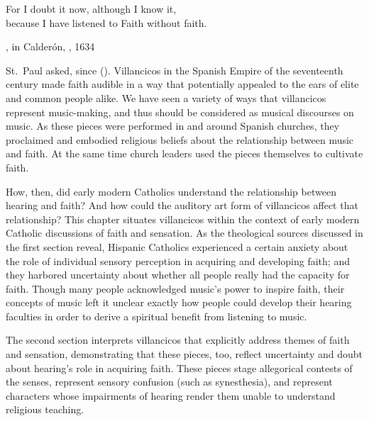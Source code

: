

\label{ch:faith-hearing}

\epigraph
{For I doubt it now, although I know it,\\
because I have listened to Faith without faith.}
{, in Calderón, , 1634}

 St.\ Paul asked, since  ().
Villancicos in the Spanish Empire of the seventeenth century made faith audible in a way that potentially appealed to the ears of elite and common people alike.
We have seen a variety of ways that villancicos represent music-making, and thus should be considered as musical discourses on music.
As these pieces were performed in and around Spanish churches, they proclaimed and embodied religious beliefs about the relationship between music and faith.
At the same time church leaders used the pieces themselves to cultivate faith.

How, then, did early modern Catholics understand the relationship between hearing and faith?
And how could the auditory art form of villancicos affect that relationship?
This chapter situates villancicos within the context of early modern Catholic discussions of faith and sensation.
As the theological sources discussed in the first section reveal, Hispanic Catholics experienced a certain anxiety about the role of individual sensory perception in acquiring and developing faith; and they harbored uncertainty about whether all people really had the capacity for faith.
Though many people acknowledged music's power to inspire faith, their concepts of music left it unclear exactly how people could develop their hearing faculties in order to derive a spiritual benefit from listening to music.

The second section interprets villancicos that explicitly address themes of faith and sensation, demonstrating that these pieces, too, reflect uncertainty and doubt about hearing's role in acquiring faith.
These pieces stage allegorical contests of the senses, represent sensory confusion (such as synesthesia), and represent characters whose impairments of hearing render them unable to understand religious teaching.

